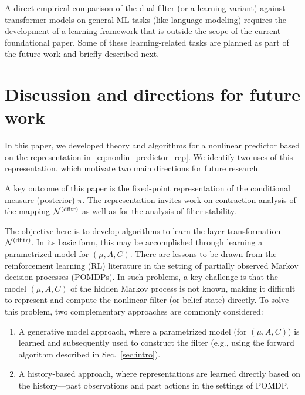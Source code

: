 \documentclass[twoside,11pt]{article}
\def\Sec#1{Sec.~\ref{#1}}
\def\Sec#1{Sec.~\ref{#1}}
\def\Sec#1{Sec~\ref{#1}}
\def\Sec#1{Sec.~\ref{#1}}
\newcommand{\newP}[1]{\medskip\noindent{\bf #1:}}
\def\Sec#1{Sec.~\ref{#1}}
\def\clN{{\cal N}}
\def\dfltr{{\text{\rm (dfltr)}}}
\begin{document}
A direct empirical comparison of the dual filter (or a learning
variant) against transformer models on general ML tasks (like language
modeling) requires the development of a learning framework that is
outside the scope of the current foundational paper.   Some of these
learning-related tasks are planned as part of the future work and
briefly described next.  



\section{Discussion and directions for future work}
\label{sec:conc}

In this paper, we developed theory and algorithms for a nonlinear
predictor based on the representation
in~\eqref{eq:nonlin_predictor_rep}.  We identify two uses of this
representation, which motivate two main directions for future research.


\newP{1. Analysis} A key outcome of this paper is the fixed-point
representation of the conditional measure (posterior) $\pi$.  The
representation invites work on contraction analysis of the mapping 
$\clN^\dfltr$ as well as for the analysis of filter stability. 


\newP{2. Learning} The objective here is to develop algorithms to
learn the layer transformation $\clN^\dfltr$.  In its basic form, this
may be accomplished through learning a parametrized model for
$(\mu,A,C)$.      
There are lessons to be drawn from the reinforcement learning (RL) literature in the setting of partially observed Markov decision processes (POMDPs).  
In such problems, a key challenge is that the model $(\mu,A,C)$ of the hidden Markov process is not known, making it difficult to represent and compute the nonlinear filter (or belief state) directly.
To solve this problem, two complementary approaches are commonly considered:
\begin{enumerate}
  \item A generative model approach, where a parametrized model (for $(\mu,A,C)$) is learned and subsequently used to construct the filter (e.g., using the forward algorithm described in \Sec{sec:intro}).
  \item A history-based approach, where representations are learned directly based on the history---past observations and past actions in the settings of POMDP. 
\end{enumerate}
\end{document}
